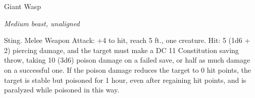 \begin{monsterbox}{Giant Wasp}
\begin{hangingpar}
\textit{Medium beast, unaligned}
\end{hangingpar}
\dndline%
\basics[%
armorclass = 12,
hitpoints = 3d8,
speed = {10 ft., fly 50 ft., swim 50 ft.}
]
\dndline%
\stats[%
STR = \stat{10},
DEX = \stat{14},
CON = \stat{10},
INT = \stat{1},
WIS = \stat{10},
CHA = \stat{3}
]
\dndline%
\details[%
skills={},
damageimmunities={},
savingthrows={},
conditionimmunities={},
damageresistances={},
damagevulnerabilities={},
senses={passive Perception 10},
challenge=1/2
]
\dndline%
\begin{monsteraction}[Sting]
Sting. Melee Weapon Attack: +4 to hit, reach 5 ft., one creature. Hit: 5 (1d6 + 2) piercing damage, and the target must make a DC 11 Constitution saving throw, taking 10 (3d6) poison damage on a failed save, or half as much damage on a successful one. If the poison damage reduces the target to 0 hit points, the target is stable but poisoned for 1 hour, even after regaining hit points, and is paralyzed while poisoned in this way.
\end{monsteraction}
\end{monsterbox}